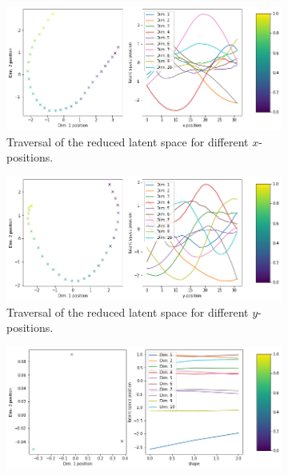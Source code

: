 \documentclass[11pt,a4paper]{article}
\begin{document}
\begin{figure}[H]
\centering
\begin{subfigure}{.48\textwidth}
\includegraphics[width=\textwidth]{images/latent_space_traversals/vae_5000_dsprites_latent_space_values_x_position.png}
\caption{Traversal of the reduced latent space for different $x$-positions.}
\end{subfigure}
\begin{subfigure}{.48\textwidth}
\includegraphics[width=\textwidth]{images/latent_space_traversals/vae_5000_dsprites_latent_space_values_y_position.png}
\caption{Traversal of the reduced latent space for different $y$-positions.}
\end{subfigure}
\begin{subfigure}{.48\textwidth}
\includegraphics[width=\textwidth]{images/latent_space_traversals/vae_5000_dsprites_latent_space_values_shape.png}

\end{subfigure}
\end{figure}
\end{document}
